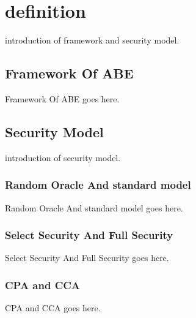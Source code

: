 \section{definition}
introduction of framework and security model.

\subsection{Framework Of ABE}
Framework Of ABE goes here.

\subsection{Security Model}
introduction of security model.

\subsubsection{Random Oracle And standard model}Random Oracle And standard model goes here.

\subsubsection{Select Security And Full Security}Select Security And Full Security goes here.

\subsubsection{CPA and CCA}CPA and CCA goes here.
